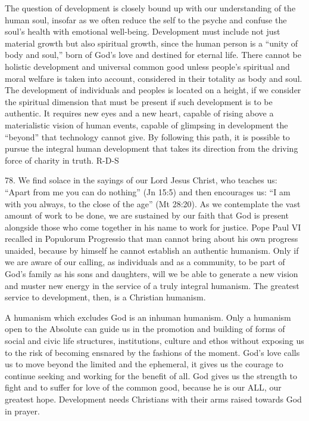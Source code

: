 \documentclass[oneside]{book}
\begin{document}
The question of development is closely bound up with our understanding of the
human soul, insofar as we often reduce the self to the psyche and confuse the
soul's health with emotional well-being. Development must include not just
material growth but also spiritual growth, since the human person is a ``unity
of body and soul,'' born of God's love and destined for eternal life. There
cannot be holistic development and universal common good unless people's
spiritual and moral welfare is taken into account, considered in their totality
as body and soul.
The development of individuals and peoples is located on a height, if we
consider the spiritual dimension that must be present if such development is to
be authentic. It requires new eyes and a new heart, capable of rising above a
materialistic vision of human events, capable of glimpsing in development the
``beyond'' that technology cannot give. By following this path, it is possible
to pursue the integral human development that takes its direction from the
driving force of charity in truth.
R-D-S

78. We find solace in the sayings of our Lord Jesus Christ, who teaches us:
``Apart from me you can do nothing'' (Jn 15:5) and then encourages us: ``I am
with you always, to the close of the age'' (Mt 28:20). As we contemplate the
vast amount of work to be done, we are sustained by our faith that God is
present alongside those who come together in his name to work for justice. Pope
Paul VI recalled in Populorum Progressio that man cannot bring about his own
progress unaided, because by himself he cannot establish an authentic
humanism. Only if we are aware of our calling, as individuals and as a
community, to be part of God's family as his sons and daughters, will we be able
to generate a new vision and muster new energy in the service of a truly
integral humanism. The greatest service to development, then, is a Christian
humanism.

A humanism which excludes God is an inhuman humanism. Only a humanism open to
the Absolute can guide us in the promotion and building of forms of social and
civic life  structures, institutions, culture and ethos  without exposing us to
the risk of becoming ensnared by the fashions of the moment. God's love calls us
to move beyond the limited and the ephemeral, it gives us the courage to
continue seeking and working for the benefit of all. God gives us the strength
to fight and to suffer for love of the common good, because he is our ALL, our
greatest hope. Development needs Christians with their arms raised towards God
in prayer.
\end{document}

